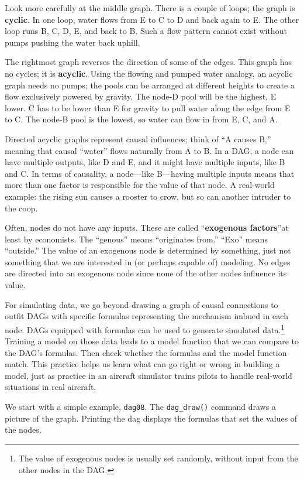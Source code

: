 \documentclass[
  letterpaper,
  DIV=11,
  numbers=noendperiod,
  oneside]{scrreprt}
\begin{document}
Look more carefully at the middle graph. There is a couple of loops; the
graph is \textbf{cyclic}. In one loop, water flows from E to C to D and
back again to E. The other loop runs B, C, D, E, and back to B. Such a
flow pattern cannot exist without pumps pushing the water back uphill.

The rightmost graph reverses the direction of some of the edges. This
graph has no cycles; it is \textbf{acyclic}. Using the flowing and
pumped water analogy, an acyclic graph needs no pumps; the pools can be
arranged at different heights to create a flow exclusively powered by
gravity. The node-D pool will be the highest, E lower. C has to be lower
than E for gravity to pull water along the edge from E to C. The node-B
pool is the lowest, so water can flow in from E, C, and A.

Directed acyclic graphs represent causal influences; think of ``A causes
B,'' meaning that causal ``water'' flows naturally from A to B. In a
DAG, a node can have multiple outputs, like D and E, and it might have
multiple inputs, like B and C. In terms of causality, a node---like
B---having multiple inputs means that more than one factor is
responsible for the value of that node. A real-world example: the rising
sun causes a rooster to crow, but so can another intruder to the coop.

Often, nodes do not have any inputs. These are called
``\textbf{exogenous factors}''at least by economists. The ``genous''
means ``originates from.'' ``Exo'' means ``outside.'' The value of an
exogenous node is determined by something, just not something that we
are interested in (or perhaps capable of) modeling. No edges are
directed into an exogenous node since none of the other nodes influence
its value.

For simulating data, we go beyond drawing a graph of causal connections
to outfit DAGs with specific formulas representing the mechanism imbued
in each node. DAGs equipped with formulas can be used to generate
simulated data.\footnote{The value of exogenous nodes is usually set
  randomly, without input from the other nodes in the DAG.} Training a
model on those data leads to a model function that we can compare to the
DAG's formulas. Then check whether the formulas and the model function
match. This practice helps us learn what can go right or wrong in
building a model, just as practice in an aircraft simulator trains
pilots to handle real-world situations in real aircraft.

We start with a simple example, \texttt{dag08}. The \texttt{dag\_draw()}
command draws a picture of the graph. Printing the dag displays the
formulas that set the values of the nodes.
\end{document}
